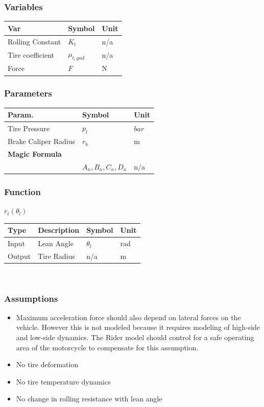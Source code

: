 \documentclass[../SimBALink.tex]{subfiles}
\begin{document}
\subsubsection{Variables}
	\begin{tabular}{ l | l | l  }
		Var					&	Symbol		&	Unit		\\	\hline
		Rolling Constant	&	$K_t$		& 	n/a \\
		Tire coefficient 	& $\mu_{t,gnd}$ &	n/a \\
		Force 				&	$F$	&	N \\
	\end{tabular}
\subsubsection{Parameters}
	\begin{tabular}{ l | l | l  }
		Param.					&	Symbol		&	Unit		\\	\hline
		Tire Pressure		&	$p_t$		&	 $bar$ \\
		Brake Caliper Radius &	$r_b$		&	m \\		
		\textbf{Magic Formula}\\		&	$A_{\kappa},B_{\kappa},C_{\kappa},D_{\kappa}$		&	 n/a \\
	\end{tabular}
	
\subsubsection{Function}
$r_t(\theta_l)$ \\
	\begin{tabular}{ l | l | l | l }
		Type				& Description		&	Symbol		&	Unit		\\	\hline
		Input 				& Lean Angle		&	$\theta_l$  & 	rad		\\
		Output 				& Tire Radius		&	n/a			&	m
	\end{tabular} \\

\subsubsection{Assumptions}
\begin{itemize}
  \item Maximum acceleration force should also depend on lateral forces on the vehicle. However this is not modeled because it requires modeling of high-side and low-side dynamics. The Rider model should control for a safe operating area of the motorcycle to compensate for this assumption. 
  \item No tire deformation
  \item No tire temperature dynamics
  \item No change in rolling resistance with lean angle 
\end{itemize}
\end{document}
